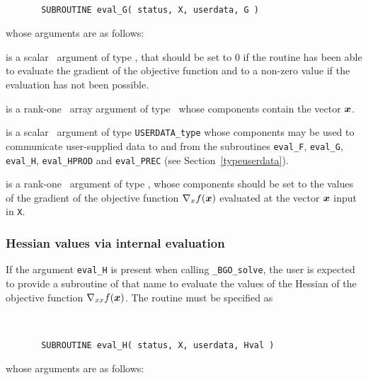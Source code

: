 \documentclass{galahad}
\newcommand{\packagename}{BGO}
\newcommand{\fullpackagename}{\libraryname\_\packagename}
\newcommand{\solver}{{\tt \fullpackagename\_solve}}
\begin{document}
\def\baselinestretch{0.8}
{\tt
\begin{verbatim}
       SUBROUTINE eval_G( status, X, userdata, G )
\end{verbatim} }
\def\baselinestretch{1.0}
\noindent whose arguments are as follows:

\begin{description}
 is a scalar \intentout\ argument of type \integer,
that should be set to 0 if the routine has been able to evaluate
the gradient of the objective function
and to a non-zero value if the evaluation has not been possible.

 is a rank-one \intentin\ array argument of type \realdp\
whose components contain the vector ${\bm{x}}$.

 is a scalar \intentinout\ argument of type
{\tt USERDATA\_type} whose components may be used
to communicate user-supplied data to and from the
subroutines {\tt eval\_F}, {\tt eval\_G},
{\tt eval\_H}, {\tt eval\_HPROD} and {\tt eval\_PREC}
(see Section~\ref{typeuserdata}).

 is a rank-one \intentout\ argument of type \realdp,
whose components should be set to the values of the gradient
of the objective function $\nabla_x f({\bm{x}})$
evaluated at the vector ${\bm{x}}$ input in {\tt X}.

\end{description}


\subsubsection{Hessian values via internal evaluation\label{hfv}}

If the argument {\tt eval\_H} is present when calling \solver, the
user is expected to provide a subroutine of that name to evaluate the
values of the Hessian of the objective function $\nabla_{xx} f({\bm{x}})$.
The routine must be specified as

\def\baselinestretch{0.8}
{\tt
\begin{verbatim}
       SUBROUTINE eval_H( status, X, userdata, Hval )
\end{verbatim} }
\def\baselinestretch{1.0}
\noindent whose arguments are as follows:
\end{document}
